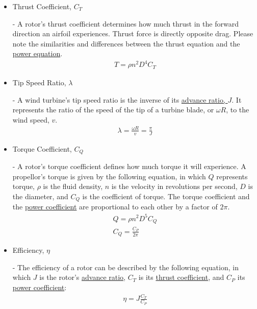 \documentclass{article}
\begin{document}
\begin{itemize}
	\item \hypertarget{CT}{Thrust Coefficient, $C_{T}$} - A rotor's thrust coefficient determines how much thrust in the forward direction an airfoil experiences. Thrust force is directly opposite drag. Please note the similarities and differences between the thrust equation and the \hyperlink{CP}{power equation}.
	\begin{equation}
	\begin{aligned}
		T = \rho n^{2} D^{4} C_{T}
	\end{aligned}
	\end{equation}
	
	\item \hypertarget{lambda}{Tip Speed Ratio, $\lambda$} - A wind turbine's tip speed ratio is the inverse of its \hyperlink{J}{advance ratio, $J$}. It represents the ratio of the speed of the tip of a turbine blade, or $\omega R$, to the wind speed, $v$.
	\begin{equation}
	\begin{aligned}
		\lambda = \frac{\omega R}{v} = \frac{\pi}{J}
	\end{aligned}
	\end{equation}
	
	\item \hypertarget{CQ}{Torque Coefficient, $C_{Q}$} - A rotor's torque coefficient defines how much torque it will experience. A propellor's torque is given by the following equation, in which $Q$ represents torque, $\rho$ is the fluid density, $n$ is the velocity in revolutions per second, $D$ is the diameter, and $C_{Q}$ is the coefficient of torque. The torque coefficient and the \hyperlink{CP}{power coefficient} are proportional to each other by a factor of $2\pi$.
	\begin{equation}
	\begin{aligned}
		Q = \rho n^{2} D^{5} C_{Q} \\
		C_{Q} = \frac{C_{P}}{2 \pi}
	\end{aligned}
	\end{equation}
	
	\item \hypertarget{eta}{Efficiency, $\eta$} - The efficiency of a rotor can be described by the following equation, in which $J$ is the rotor's \hyperlink{J}{advance ratio}, $C_{T}$ is its \hyperlink{CT}{thrust coefficient}, and $C_{P}$ its \hyperlink{CP}{power coefficient}:
	\begin{equation}
	\begin{aligned}
		\eta = J \frac{C_{T}}{C_{P}}
	\end{aligned}
	\end{equation}
	

\end{itemize}
\end{document}
